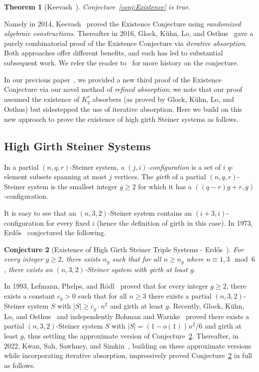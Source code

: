 \documentclass[11pt]{article}
\newcounter{i}
\theoremstyle{plain}
\newtheorem{thm}{Theorem}[section]
\newtheorem{conj}[thm]{Conjecture}
\theoremstyle{plain} %
\theoremstyle{definition}
\begin{document}
\begin{thm}[Keevash~\cite{K14}]\label{thm:Existence}
Conjecture~\ref{conj:Existence} is true.   
\end{thm}

Namely in 2014, Keevash~\cite{K14} proved the Existence Conjecture using \emph{randomized algebraic constructions}. Thereafter in 2016, Glock, K\"{u}hn, Lo, and Osthus~\cite{GKLO16} gave a purely combinatorial proof of the Existence Conjecture via \emph{iterative absorption}. Both approaches offer different benefits, and each has led to substantial subsequent work. We refer the reader to~\cite{W03, K14, GKLO16} for more history on the conjecture.

In our previous paper~\cite{DPI}, we provided a new third proof of the Existence Conjecture via our novel method of \emph{refined absorption}; we note that our proof assumed the existence of $K_q^r$ absorbers (as proved by Glock, K\"uhn, Lo, and Osthus) but sidestepped the use of iterative absorption. Here we build on this new approach to prove the existence of high girth Steiner systems as follows.

\subsection{High Girth Steiner Systems}


In a partial $(n,q,r)$-Steiner system, a \emph{$(j, i)$-configuration} is a set of $i$ $q$-element subsets spanning at most $j$ vertices. The \emph{girth} of a partial $(n,q,r)$-Steiner system is the smallest integer $g \geq 2$ for which it has a $((q-r)g+r, g)$-configuration.

It is easy to see that an $(n,3,2)$-Steiner system contains an $(i+3,i)$-configuration for every fixed $i$ (hence the definition of girth in this case). In 1973, Erd\H{o}s~\cite{E73} conjectured the following. 

\begin{conj}[Existence of High Girth Steiner Triple Systems - Erd\H{o}s~\cite{E73}]\label{conj:Erdos}
For every integer $g\geq2$, there exists $n_g$ such that for all $n \geq n_g$ where $n\equiv 1,3 \mod 6$, there exists an $(n,3,2)$-Steiner system with girth at least $g$.
\end{conj}

In 1993, Lefmann, Phelps, and R\"odl~\cite{LPR93} proved that for every integer $g\geq2$, there exists a constant $c_g>0$ such that for all $n\geq 3$ there exists a partial $(n,3,2)$-Steiner system $S$ with $|S|\ge c_g \cdot n^2$ and girth at least $g$. Recently, Glock, K\"{u}hn, Lo, and Osthus~\cite{GKLO20} and independently Bohman and Warnke~\cite{BW19} proved there exists a partial $(n,3,2)$-Steiner system $S$ with $|S|=(1-o(1))n^2/6$ and girth at least $g$, thus settling the approximate version of Conjecture~\ref{conj:Erdos}. Thereafter, in 2022, Kwan, Sah, Sawhney, and Simkin~\cite{KSSS22}, building on these approximate versions while incorporating iterative absorption, impressively proved Conjecture~\ref{conj:Erdos} in full as follows.
\end{document}
